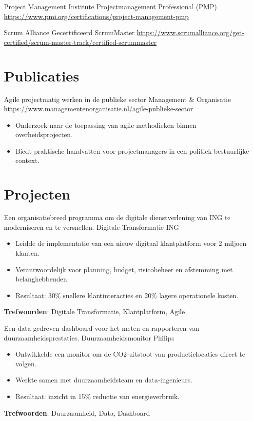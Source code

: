 \documentclass[a4paper, serif, 10pt]{moderncv}
\begin{document}
        {Project Management Institute}
        {Projectmanagement Professional (PMP)}
        {\url{https://www.pmi.org/certifications/project-management-pmp}}
        {}
        {}

        {Scrum Alliance}
        {Gecertificeerd ScrumMaster}
        {\url{https://www.scrumalliance.org/get-certified/scrum-master-track/certified-scrummaster}}
        {}
        {}
\section{Publicaties}

        {Agile projectmatig werken in de publieke sector}
        {Management \& Organisatie}
        {\url{https://www.managementenorganisatie.nl/agile-publieke-sector}}
        {}
        {\begin{itemize}
\item Onderzoek naar de toepassing van agile methodieken binnen overheidsprojecten.
\item Biedt praktische handvatten voor projectmanagers in een politiek-bestuurlijke context.
\end{itemize}}
\section{Projecten}

        {Een organisatiebreed programma om de digitale dienstverlening van ING te moderniseren en te versnellen.}
        {Digitale Transformatie ING}
        {}
        {}
        {\begin{itemize}
\item Leidde de implementatie van een nieuw digitaal klantplatform voor 2 miljoen klanten.
\item Verantwoordelijk voor planning, budget, risicobeheer en afstemming met belanghebbenden.
\item Resultaat: 30\% snellere klantinteracties en 20\% lagere operationele kosten.
\end{itemize}
\textbf{Trefwoorden}: Digitale Transformatie, Klantplatform, Agile}

        {Een data-gedreven dashboard voor het meten en rapporteren van duurzaamheidsprestaties.}
        {Duurzaamheidsmonitor Philips}
        {}
        {}
        {\begin{itemize}
\item Ontwikkelde een monitor om de CO2-uitstoot van productielocaties direct te volgen.
\item Werkte samen met duurzaamheidsteam en data-ingenieurs.
\item Resultaat: inzicht in 15\% reductie van energieverbruik.
\end{itemize}
\textbf{Trefwoorden}: Duurzaamheid, Data, Dashboard}
\end{document}
